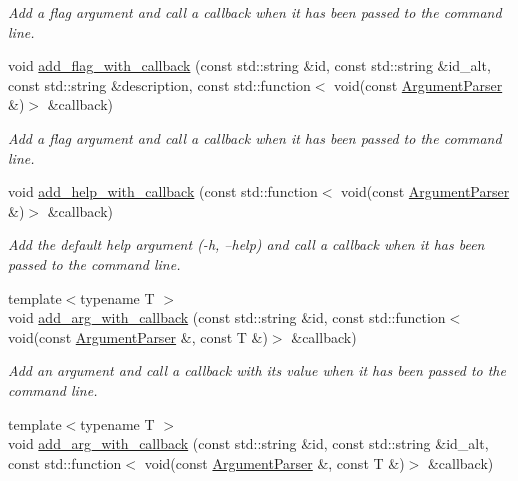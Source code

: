 \begin{DoxyCompactItemize}
\begin{DoxyCompactList}\small\item\em Add a flag argument and call a callback when it has been passed to the command line. \end{DoxyCompactList}\item 
void \hyperlink{classcppargparse_1_1parser_1_1ArgumentParser_a6c466f78b14f49750ef608e3a5977b74}{add\+\_\+flag\+\_\+with\+\_\+callback} (const std\+::string \&id, const std\+::string \&id\+\_\+alt, const std\+::string \&description, const std\+::function$<$ void(const \hyperlink{classcppargparse_1_1parser_1_1ArgumentParser}{Argument\+Parser} \&)$>$ \&callback)
\begin{DoxyCompactList}\small\item\em Add a flag argument and call a callback when it has been passed to the command line. \end{DoxyCompactList}\item 
void \hyperlink{classcppargparse_1_1parser_1_1ArgumentParser_a5763e301e54e619c96d9364f75b1d4c9}{add\+\_\+help\+\_\+with\+\_\+callback} (const std\+::function$<$ void(const \hyperlink{classcppargparse_1_1parser_1_1ArgumentParser}{Argument\+Parser} \&)$>$ \&callback)
\begin{DoxyCompactList}\small\item\em Add the default help argument (-\/h, --help) and call a callback when it has been passed to the command line. \end{DoxyCompactList}\item 
{\footnotesize template$<$typename T $>$ }\\void \hyperlink{classcppargparse_1_1parser_1_1ArgumentParser_aad667a38fb847cd48b15f66cb99c1818}{add\+\_\+arg\+\_\+with\+\_\+callback} (const std\+::string \&id, const std\+::function$<$ void(const \hyperlink{classcppargparse_1_1parser_1_1ArgumentParser}{Argument\+Parser} \&, const T \&)$>$ \&callback)
\begin{DoxyCompactList}\small\item\em Add an argument and call a callback with its value when it has been passed to the command line. \end{DoxyCompactList}\item 
{\footnotesize template$<$typename T $>$ }\\void \hyperlink{classcppargparse_1_1parser_1_1ArgumentParser_a303a12481a661f3d38c66718d6e593a7}{add\+\_\+arg\+\_\+with\+\_\+callback} (const std\+::string \&id, const std\+::string \&id\+\_\+alt, const std\+::function$<$ void(const \hyperlink{classcppargparse_1_1parser_1_1ArgumentParser}{Argument\+Parser} \&, const T \&)$>$ \&callback)

\end{DoxyCompactItemize}
